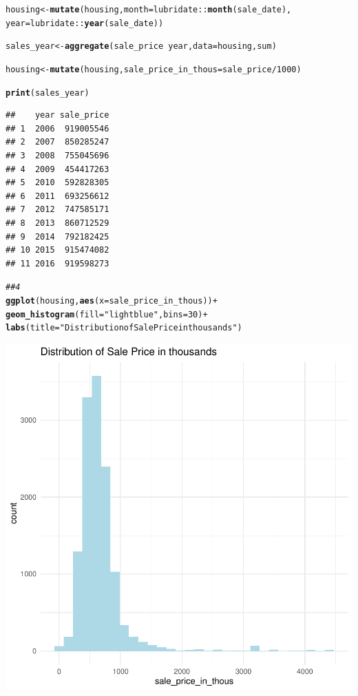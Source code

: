 \documentclass{article}\usepackage[]{graphicx}\usepackage[]{xcolor}
\makeatletter
\newcommand{\hlnum}[1]{\textcolor[rgb]{0.686,0.059,0.569}{#1}}%
\newcommand{\hlstr}[1]{\textcolor[rgb]{0.192,0.494,0.8}{#1}}%
\newcommand{\hlcom}[1]{\textcolor[rgb]{0.678,0.584,0.686}{\textit{#1}}}%
\newcommand{\hlopt}[1]{\textcolor[rgb]{0,0,0}{#1}}%
\newcommand{\hlstd}[1]{\textcolor[rgb]{0.345,0.345,0.345}{#1}}%
\newcommand{\hlkwb}[1]{\textcolor[rgb]{0.69,0.353,0.396}{#1}}%
\newcommand{\hlkwc}[1]{\textcolor[rgb]{0.333,0.667,0.333}{#1}}%
\newcommand{\hlkwd}[1]{\textcolor[rgb]{0.737,0.353,0.396}{\textbf{#1}}}%
\newenvironment{kframe}{%
 \def\at@end@of@kframe{}%
 \ifinner\ifhmode%
  \def\at@end@of@kframe{\end{minipage}}%
  \begin{minipage}{\columnwidth}%
 \fi\fi%
 \def\FrameCommand##1{\hskip\@totalleftmargin \hskip-\fboxsep
 \colorbox{shadecolor}{##1}\hskip-\fboxsep
     \hskip-\linewidth \hskip-\@totalleftmargin \hskip\columnwidth}%
 \MakeFramed {\advance\hsize-\width
   \@totalleftmargin\z@ \linewidth\hsize
   \@setminipage}}%
 {\par\unskip\endMakeFramed%
 \at@end@of@kframe}
\newenvironment{knitrout}{}{} %
\makeatother
\begin{document}
\begin{knitrout}
\begin{kframe}
\begin{alltt}
\hlstd{housing} \hlkwb{<-} \hlkwd{mutate}\hlstd{(housing,} \hlkwc{month} \hlstd{= lubridate} \hlopt{::} \hlkwd{month} \hlstd{(sale_date),}
                          \hlkwc{year} \hlstd{= lubridate} \hlopt{::} \hlkwd{year} \hlstd{(sale_date))}

\hlstd{sales_year} \hlkwb{<-} \hlkwd{aggregate}\hlstd{(sale_price} \hlopt{~} \hlstd{year,} \hlkwc{data} \hlstd{= housing, sum)}

\hlstd{housing} \hlkwb{<-} \hlkwd{mutate}\hlstd{(housing,} \hlkwc{sale_price_in_thous} \hlstd{= sale_price} \hlopt{/} \hlnum{1000}\hlstd{)}

\hlkwd{print}\hlstd{(sales_year)}
\end{alltt}
\begin{verbatim}
##    year sale_price
## 1  2006  919005546
## 2  2007  850285247
## 3  2008  755045696
## 4  2009  454417263
## 5  2010  592828305
## 6  2011  693256612
## 7  2012  747585171
## 8  2013  860712529
## 9  2014  792182425
## 10 2015  915474082
## 11 2016  919598273
\end{verbatim}
\begin{alltt}
\hlcom{## 4}
\hlkwd{ggplot}\hlstd{(housing,} \hlkwd{aes}\hlstd{(}\hlkwc{x} \hlstd{= sale_price_in_thous))} \hlopt{+}
  \hlkwd{geom_histogram}\hlstd{(}\hlkwc{fill} \hlstd{=} \hlstr{"lightblue"}\hlstd{,} \hlkwc{bins} \hlstd{=} \hlnum{30}\hlstd{)} \hlopt{+}
  \hlkwd{labs}\hlstd{(}\hlkwc{title} \hlstd{=} \hlstr{"Distribution of Sale Price in thousands"}\hlstd{)}
\end{alltt}
\end{kframe}

{\centering \includegraphics[width=.6\linewidth]{figure/assignment-04-Reppeto-Brian-Rnwauto-report-1} 

}



\end{knitrout}
\end{document}
